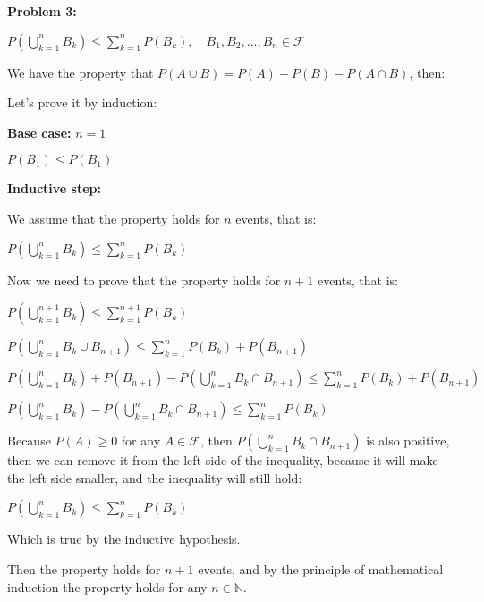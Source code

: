 \textbf{Problem 3:}

\singlespacing

$P\left(\bigcup_{k=1}^{n} B_k\right) \leq \sum_{k=1}^{n} P(B_k),\quad B_1, B_2, \dots, B_n \in \mathcal{F}$

\singlespacing

We have the property that $P(A \cup B) = P(A) + P(B) - P(A \cap B)$, then:

\singlespacing

Let's prove it by induction:

\singlespacing

\textbf{Base case:} $n = 1$

\singlespacing

$P(B_1) \leq P(B_1)$

\singlespacing

\textbf{Inductive step:}

\singlespacing

We assume that the property holds for $n$ events, that is:

\singlespacing

$P\left(\bigcup_{k=1}^{n} B_k\right) \leq \sum_{k=1}^{n} P(B_k)$

\singlespacing

Now we need to prove that the property holds for $n + 1$ events, that is:

\singlespacing

$P\left(\bigcup_{k=1}^{n+1} B_k\right) \leq \sum_{k=1}^{n+1} P(B_k)$

\singlespacing

$P\left(\bigcup_{k=1}^{n} B_k \cup B_{n+1}\right) \leq \sum_{k=1}^{n} P(B_k) + P(B_{n+1})$

\singlespacing

$P\left(\bigcup_{k=1}^{n} B_k\right) + P(B_{n+1}) - P\left(\bigcup_{k=1}^{n} B_k \cap B_{n+1}\right) \leq \sum_{k=1}^{n} P(B_k) + P(B_{n+1})$

\singlespacing

$P\left(\bigcup_{k=1}^{n} B_k\right) - P\left(\bigcup_{k=1}^{n} B_k \cap B_{n+1}\right) \leq \sum_{k=1}^{n} P(B_k)$

\singlespacing

Because $P(A) \geq 0$ for any $A \in \mathcal{F}$, then $P\left(\bigcup_{k=1}^{n} B_k \cap B_{n+1}\right)$
is also positive, then we can remove it from the left side of the inequality, because
it will make the left side smaller, and the inequality will still hold:

\singlespacing

$P\left(\bigcup_{k=1}^{n} B_k\right) \leq \sum_{k=1}^{n} P(B_k)$

\singlespacing

Which is true by the inductive hypothesis.

\singlespacing

Then the property holds for $n + 1$ events, and by the principle of mathematical induction
the property holds for any $n \in \mathbb{N}$.
